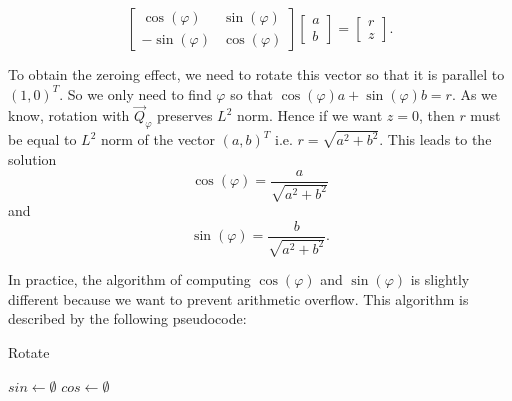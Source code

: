 \begin{equation}
    \begin{bmatrix} 
        \cos(\varphi) & \sin(\varphi) \\
        - \sin(\varphi) & \cos(\varphi)
        \end{bmatrix}
        \begin{bmatrix} 
            a \\
            b
            \end{bmatrix} = 
            \begin{bmatrix} 
                r \\
                z
                \end{bmatrix}.
\end{equation}

To obtain the zeroing effect, we need to rotate this vector so that it is parallel to $(1, 0)^T$. So we only need to find $\varphi$ so that $\cos(\varphi) a + \sin(\varphi)b = r $.
As we know, rotation with $\vec{Q}_\varphi$ preserves $L^2$ norm. Hence if we want $z = 0$, then $r$ must be equal to $L^2$ norm of the vector $(a, b)^T$ i.e. $r = \sqrt{a^2 + b^2}$. 
This leads to the solution
\begin{equation} \label{givens_cos}
    \cos(\varphi) = \frac{a}{\sqrt{a^2 + b^2}} 
\end{equation}
and   
\begin{equation} \label{givens_sin}
    \sin(\varphi) = \frac{b}{\sqrt{a^2 + b^2}}. 
\end{equation}

In practice, the algorithm of computing $\cos(\varphi)$ and  $\sin(\varphi)$ is slightly different because we want to prevent arithmetic overflow. This algorithm is described by the following pseudocode:

\begin{algorithm}[H]
    \label{alg:givens}
    \caption{Rotate}
    $sin \gets \emptyset$\;
    $cos \gets \emptyset$\;
    \;
\end{algorithm}

